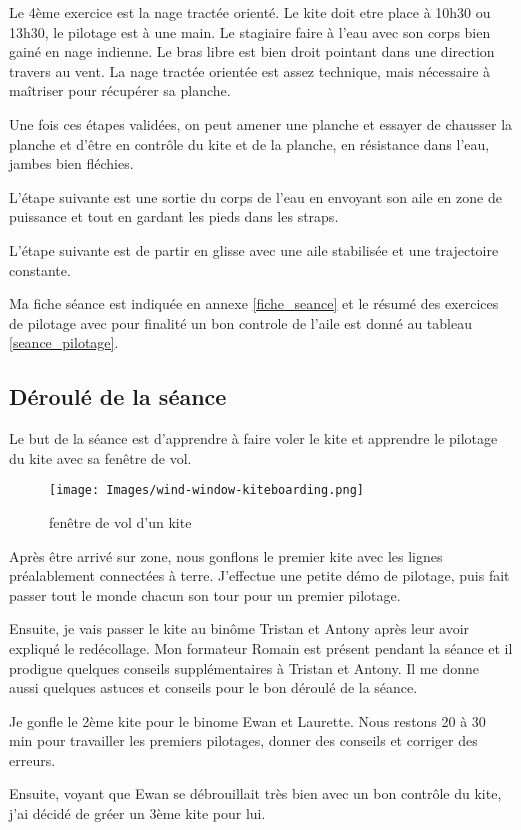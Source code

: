 \documentclass[11pt,a4paper]{report}
\begin{document}
Le 4ème exercice est la nage tractée orienté.
Le kite doit etre place à 10h30 ou 13h30, le pilotage
est à une main. Le stagiaire faire  à l'eau
avec son corps bien gainé en nage indienne. Le bras
libre est bien droit pointant dans une direction 
travers au vent. La nage tractée orientée est assez
technique, mais nécessaire à maîtriser pour récupérer 
sa planche.

Une fois ces étapes validées, on peut
amener une planche et essayer de chausser la planche
et d’être en contrôle du kite et de la planche, 
en résistance dans l'eau, jambes bien fléchies.

L'étape suivante est une sortie du corps de l'eau
en envoyant son aile en zone de puissance et tout en 
gardant les pieds dans les straps. 

L'étape suivante est de partir en glisse avec
une aile stabilisée et une trajectoire constante.

Ma fiche séance est indiquée en annexe \ref{fiche_seance}
et le résumé des exercices de pilotage avec pour
finalité un bon controle de l'aile est donné
au tableau \ref{seance_pilotage}.

\subsection{Déroulé de la séance}
Le but de la séance est d'apprendre à faire voler le kite et
apprendre le pilotage du kite avec sa fen\^etre de vol.
\begin{figure}
\centering
\texttt{[image: Images/wind-window-kiteboarding.png]}
\caption{fen\^etre de vol d'un kite\label{fenetre}}
\end{figure} 

Après \^etre arrivé sur zone, nous gonflons le premier kite avec les
lignes préalablement connectées à terre. J'effectue une petite démo
de pilotage, puis fait passer tout le monde chacun son tour pour
un premier pilotage.

Ensuite, je vais passer le kite au binôme Tristan et Antony après leur
avoir expliqué le redécollage. Mon formateur Romain est présent pendant la
séance et il prodigue quelques conseils supplémentaires à Tristan et Antony.
Il me donne aussi quelques astuces et conseils pour le bon déroulé de la séance.

Je gonfle le 2ème kite pour le binome Ewan et Laurette.
Nous restons 20 à 30 min pour travailler les premiers pilotages,
donner des conseils et corriger des erreurs.

Ensuite, voyant que Ewan se débrouillait très bien avec un bon contrôle du 
kite, j'ai décidé de gréer un 3ème kite pour lui.
\end{document}

